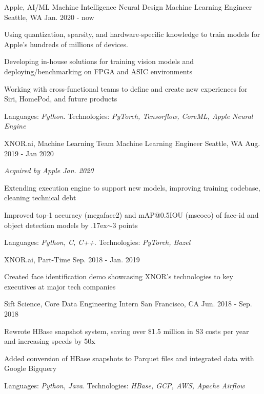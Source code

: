 \begin{cventries}
    \vspace{-0.6em}
  \cventry
    {Apple, AI/ML Machine Intelligence Neural Design}
    {Machine Learning Engineer}
    {Seattle, WA}
    {Jan. 2020 - now}
    {
      \begin{cvitems}
        \item {Using quantization, sparsity, and hardware-specific knowledge to train models for Apple's hundreds of millions of devices.}
        \item {Developing in-house solutions for training vision models and deploying/benchmarking on FPGA and ASIC environments}
        \item {Working with cross-functional teams to define and create new experiences for Siri, HomePod, and future products}
        \item {Languages: \textit{Python}. Technologies: \textit{PyTorch, Tensorflow, CoreML, Apple Neural Engine}}
	\vspace{-1em}
      \end{cvitems}
    }

  \cventry
    {XNOR.ai, Machine Learning Team}
    {Machine Learning Engineer}
    {Seattle, WA}
    {Aug. 2019 - Jan 2020}
    {
      \begin{cvitems}
        \item {\textit{Acquired by Apple Jan. 2020}}
        \item {Extending execution engine to support new models, improving training codebase, cleaning technical debt}
        \item {Improved top-1 accuracy (megaface2) and mAP@0.5IOU (mscoco) of face-id and object detection models by {\raise.17ex\hbox{$\scriptstyle\sim$}}3 points}
        \item {Languages: \textit{Python, C, C++}. Technologies: \textit{PyTorch, Bazel}}
	\vspace{-1em}
      \end{cvitems}
    }
  \cventry
    {XNOR.ai, Part-Time}
    {}
    {}
    {Sep. 2018 - Jan. 2019}
    {
      \begin{cvitems}
        \item {Created face identification demo showcasing XNOR's technologies to key executives at major tech companies} 
      \end{cvitems}
    }


    \vspace{-1.2em}
  \cventry
    {Sift Science, Core Data}
    {Engineering Intern}
    {San Francisco, CA}
    {Jun. 2018 - Sep. 2018}
    {
      \begin{cvitems}
        \item {Rewrote HBase snapshot system, saving over \$1.5 million in S3 costs per year and increasing speeds by 50x}
        \item {Added conversion of HBase snapshots to Parquet files and integrated data with Google Bigquery}
        \item {Languages: \textit{Python, Java}. Technologies: \textit{HBase, GCP, AWS, Apache Airflow}}
      \end{cvitems}
    }


\end{cventries}
